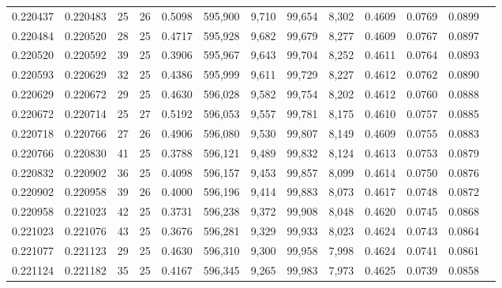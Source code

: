 \begin{tabular}{rrrrrrrrrrrrr}
0.220437 & 0.220483 &  25 &  26 &                                     0.5098 & 595,900 &   9,710 &  99,654 &   8,302 & 0.4609 & 0.0769 & 0.0899 \\
0.220484 & 0.220520 &  28 &  25 &                                     0.4717 & 595,928 &   9,682 &  99,679 &   8,277 & 0.4609 & 0.0767 & 0.0897 \\
0.220520 & 0.220592 &  39 &  25 &                                     0.3906 & 595,967 &   9,643 &  99,704 &   8,252 & 0.4611 & 0.0764 & 0.0893 \\
0.220593 & 0.220629 &  32 &  25 &                                     0.4386 & 595,999 &   9,611 &  99,729 &   8,227 & 0.4612 & 0.0762 & 0.0890 \\
0.220629 & 0.220672 &  29 &  25 &                                     0.4630 & 596,028 &   9,582 &  99,754 &   8,202 & 0.4612 & 0.0760 & 0.0888 \\
0.220672 & 0.220714 &  25 &  27 &                                     0.5192 & 596,053 &   9,557 &  99,781 &   8,175 & 0.4610 & 0.0757 & 0.0885 \\
0.220718 & 0.220766 &  27 &  26 &                                     0.4906 & 596,080 &   9,530 &  99,807 &   8,149 & 0.4609 & 0.0755 & 0.0883 \\
0.220766 & 0.220830 &  41 &  25 &                                     0.3788 & 596,121 &   9,489 &  99,832 &   8,124 & 0.4613 & 0.0753 & 0.0879 \\
0.220832 & 0.220902 &  36 &  25 &                                     0.4098 & 596,157 &   9,453 &  99,857 &   8,099 & 0.4614 & 0.0750 & 0.0876 \\
0.220902 & 0.220958 &  39 &  26 &                                     0.4000 & 596,196 &   9,414 &  99,883 &   8,073 & 0.4617 & 0.0748 & 0.0872 \\
0.220958 & 0.221023 &  42 &  25 &                                     0.3731 & 596,238 &   9,372 &  99,908 &   8,048 & 0.4620 & 0.0745 & 0.0868 \\
0.221023 & 0.221076 &  43 &  25 &                                     0.3676 & 596,281 &   9,329 &  99,933 &   8,023 & 0.4624 & 0.0743 & 0.0864 \\
0.221077 & 0.221123 &  29 &  25 &                                     0.4630 & 596,310 &   9,300 &  99,958 &   7,998 & 0.4624 & 0.0741 & 0.0861 \\
0.221124 & 0.221182 &  35 &  25 &                                     0.4167 & 596,345 &   9,265 &  99,983 &   7,973 & 0.4625 & 0.0739 & 0.0858 \\

\end{tabular}
